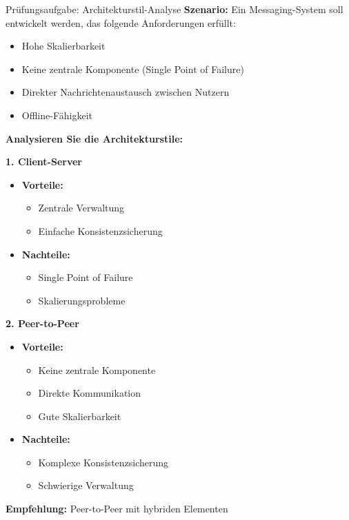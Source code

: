 \begin{example}{Prüfungsaufgabe: Architekturstil-Analyse}
\textbf{Szenario:}
Ein Messaging-System soll entwickelt werden, das folgende Anforderungen erfüllt:
\begin{itemize}
    \item Hohe Skalierbarkeit
    \item Keine zentrale Komponente (Single Point of Failure)
    \item Direkter Nachrichtenaustausch zwischen Nutzern
    \item Offline-Fähigkeit
\end{itemize}

\textbf{Analysieren Sie die Architekturstile:}

\textbf{1. Client-Server}
\begin{itemize}
    \item \textbf{Vorteile:}
    \begin{itemize}
        \item Zentrale Verwaltung
        \item Einfache Konsistenzsicherung
    \end{itemize}
    \item \textbf{Nachteile:}
    \begin{itemize}
        \item Single Point of Failure
        \item Skalierungsprobleme
    \end{itemize}
\end{itemize}

\textbf{2. Peer-to-Peer}
\begin{itemize}
    \item \textbf{Vorteile:}
    \begin{itemize}
        \item Keine zentrale Komponente
        \item Direkte Kommunikation
        \item Gute Skalierbarkeit
    \end{itemize}
    \item \textbf{Nachteile:}
    \begin{itemize}
        \item Komplexe Konsistenzsicherung
        \item Schwierige Verwaltung
    \end{itemize}
\end{itemize}

\textbf{Empfehlung:} Peer-to-Peer mit hybriden Elementen
\end{example}

